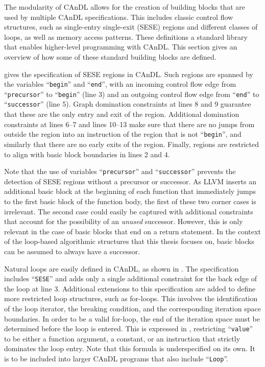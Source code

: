     The modularity of CAnDL allows for the creation of building blocks that are
    used by multiple CAnDL specifications.
    This includes classic control flow structures, such as single-entry
    single-exit (SESE) regions and different classes of loops, as well as memory
    access patterns.
    These definitions a standard library that enables higher-level programming
    with CAnDL.
    This section gives an overview of how some of these standard building
    blocks are defined.

     gives the specification of SESE regions in CAnDL.
    Such regions are spanned by the variables ``{\tt begin}'' and ``{\tt end}'',
    with an incoming control flow edge from ``{\tt precursor}'' to
    ``{\tt begin}'' (line 3) and
    an outgoing control flow edge from ``{\tt end}'' to ``{\tt successor}''
    (line 5).
    Graph domination constraints at lines 8 and 9 guarantee that these are the
    only entry and exit of the region.
    Additional domination constraints at lines 6--7 and lines 10--13 make sure
    that there are no jumps from outside the region into an instruction of the
    region that is not ``{\tt begin}'', and similarly that there are no early
    exits of the region.
    Finally, regions are restricted to align with basic block boundaries in
    lines 2 and 4.

    Note that the use of variables ``{\tt precursor}'' and ``{\tt successor}''
    prevents the detection of SESE regions without a precursor or successor.
    As LLVM inserts an additional basic block at the beginning of each function
    that immediately jumps to the first basic block of the function body, the
    first of these two corner cases is irrelevant.
    The second case could easily be captured with additional constraints that
    account for the possibility of an {\it unused} successor.
    However, this is only relevant in the case of basic blocks that end on a
    return statement.
    In the context of the loop-based algorithmic structures that this
    thesis focuses on, basic blocks can be assumed to always have a successor.

    Natural loops are easily defined in CAnDL, as shown in .
    The specification includes ``{\tt SESE}'' and adds only a single additional
    constraint for the back edge of the loop at line 3.
    Additional extensions to this specification are added to define more
    restricted loop structures, such as for-loops.
    This involves the identification of the loop iterator, the breaking
    condition, and the corresponding iteration space boundaries.
    In order to be a valid for-loop, the end of the iteration space must be
    determined before the loop is entered.
    This is expressed in , restricting ``{\tt value}'' to be
    either a function argument, a constant, or an instruction that strictly
    dominates the loop entry.
    Note that this formula is underspecified on its own.
    It is to be included into larger CAnDL programs that also include
    ``{\tt Loop}''.

